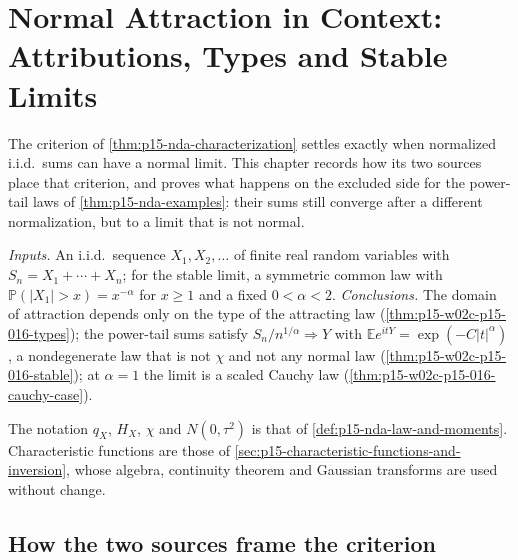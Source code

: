 \chapter{Normal Attraction in Context: Attributions, Types and Stable Limits}
\label{sec:p15-w02c-p15-016}

The criterion of \cref{thm:p15-nda-characterization} settles exactly
when normalized i.i.d.\ sums can have a normal limit. This chapter
records how its two sources place that criterion, and proves what
happens on the excluded side for the power-tail laws of
\cref{thm:p15-nda-examples}: their sums still converge after a
different normalization, but to a limit that is not normal.

\emph{Inputs.} An i.i.d.\ sequence \(X_1,X_2,\ldots\) of finite real
random variables with \(S_n=X_1+\cdots+X_n\); for the stable limit, a
symmetric common law with \(\mathbb P(|X_1|>x)=x^{-\alpha}\) for
\(x\geq1\) and a fixed \(0<\alpha<2\).
\emph{Conclusions.} The domain of attraction depends only on the type
of the attracting law (\cref{thm:p15-w02c-p15-016-types}); the
power-tail sums satisfy \(S_n/n^{1/\alpha}\Rightarrow Y\) with
\(\mathbb Ee^{itY}=\exp(-C|t|^\alpha)\), a nondegenerate law that is
not \(\chi\) and not any normal law
(\cref{thm:p15-w02c-p15-016-stable}); at \(\alpha=1\) the
limit is a scaled Cauchy law
(\cref{thm:p15-w02c-p15-016-cauchy-case}).

The notation \(q_X\), \(H_X\), \(\chi\) and \(N(0,\tau^2)\) is that of
\cref{def:p15-nda-law-and-moments}. Characteristic functions are those
of \cref{sec:p15-characteristic-functions-and-inversion}, whose
algebra, continuity theorem and Gaussian transforms are used without
change.

\section{How the two sources frame the criterion}
\label{sec:p15-w02c-p15-016-framing}

